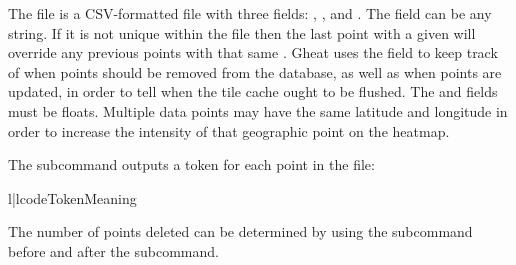 \documentclass{manual}
\begin{document}
The  file is a CSV-formatted file with three fields:
, , and . The  field
can be any string. If it is not unique within the  file then
the last point with a given  will override any previous points
with that same . Gheat uses the  field to keep
track of when points should be removed from the database, as well as when
points are updated, in order to tell when the tile cache ought to be flushed.
The  and  fields must be floats. Multiple data
points may have the same latitude and longitude in order to increase the
intensity of that geographic point on the heatmap.

The  subcommand outputs a token for each point in the
 file:

\begin{tableii}{l|l}{code}{Token}{Meaning}
\end{tableii}

The number of points deleted can be determined by using the 
subcommand before and after the  subcommand.
\end{document}
